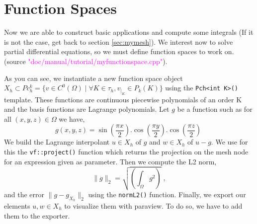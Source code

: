 %


\section{Function Spaces}
\label{sec:myfunctionspace}

Now we are able to construct basic \feel applications and compute some integrals 
(If it is not the case, get back to section \ref{sec:mymesh}).
We interest now to solve partial differential equations, so we must define function spaces
to work on. (source \textcolor{magenta}{"doc/manual/tutorial/myfunctionspace.cpp"}).
%
\vspace{2mm}

\vspace{2mm}
%
As you can see, we instantiate a new function space object
$X_h\subset Pc_h^k=\{v\in C^0(\Omega) \;|\; \forall K\in \tau_h,  v_{|_K}\in P_k(K)\}$ using the \lstinline!Pch<int K>()!
template. These functions are continuous piecewise polynomials of an order K and the basis functions are
Lagrange polynomials.
Let $g$ be a function such as for all $(x,y,z)\in \Omega$ we have,
%
\[
    g(x,y,z)= \sin(\frac{\pi x}{2}).\cos(\frac{\pi y}{2}).\cos(\frac{\pi z}{2}) \;
\]
%
We build the Lagrange interpolant $u\in X_h$ of $g$ and $w\in X_h$ of $u-g$. We use for this the
\lstinline!vf::project()! function  which returns the projection on the mesh node for
an expression given as parameter. Then we compute the L2 norm,
%
\[
    \| g \|_2 =
    \sqrt{\left( \int_\Omega g^2 \right)} \;,
\]
%
and the error $\| g - g_{X_h}\|_2$
using the \lstinline!normL2()! function.
Finally, we export our elements $u,w\in X_h$ to visualize them with paraview.
To do so, we have to add them to the exporter.

